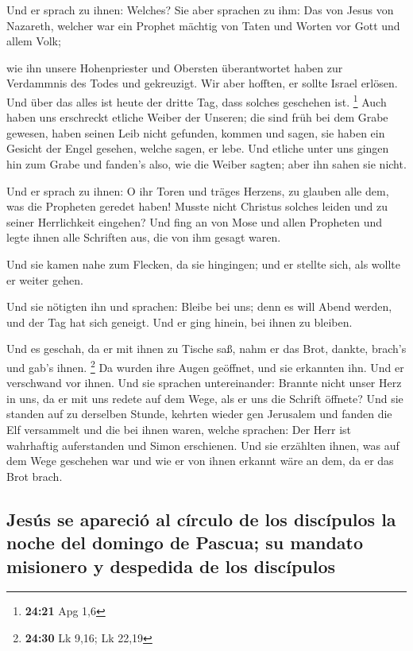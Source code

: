  Und er sprach zu ihnen: Welches? Sie aber sprachen zu
ihm: Das von Jesus von Nazareth, welcher war ein Prophet mächtig von
Taten und Worten vor Gott und allem Volk;

 wie ihn unsere Hohenpriester und Obersten überantwortet
haben zur Verdammnis des Todes und gekreuzigt.  Wir aber
hofften, er sollte Israel erlösen. Und über das alles ist heute der
dritte Tag, dass solches geschehen ist. \footnote{\textbf{24:21} Apg 1,6}
 Auch haben uns erschreckt etliche Weiber der Unseren;
die sind früh bei dem Grabe gewesen,  haben seinen Leib
nicht gefunden, kommen und sagen, sie haben ein Gesicht der Engel
gesehen, welche sagen, er lebe.  Und etliche unter uns
gingen hin zum Grabe und fanden's also, wie die Weiber sagten; aber ihn
sahen sie nicht.

 Und er sprach zu ihnen: O ihr Toren und träges Herzens,
zu glauben alle dem, was die Propheten geredet haben! 
Musste nicht Christus solches leiden und zu seiner Herrlichkeit
eingehen?  Und fing an von Mose und allen Propheten und
legte ihnen alle Schriften aus, die von ihm gesagt waren.

 Und sie kamen nahe zum Flecken, da sie hingingen; und er
stellte sich, als wollte er weiter gehen.

 Und sie nötigten ihn und sprachen: Bleibe bei uns; denn
es will Abend werden, und der Tag hat sich geneigt. Und er ging hinein,
bei ihnen zu bleiben.

 Und es geschah, da er mit ihnen zu Tische saß, nahm er
das Brot, dankte, brach's und gab's ihnen. \footnote{\textbf{24:30} Lk
  9,16; Lk 22,19}  Da wurden ihre Augen geöffnet, und sie
erkannten ihn. Und er verschwand vor ihnen.  Und sie
sprachen untereinander: Brannte nicht unser Herz in uns, da er mit uns
redete auf dem Wege, als er uns die Schrift öffnete?  Und
sie standen auf zu derselben Stunde, kehrten wieder gen Jerusalem und
fanden die Elf versammelt und die bei ihnen waren, 
welche sprachen: Der Herr ist wahrhaftig auferstanden und Simon
erschienen.  Und sie erzählten ihnen, was auf dem Wege
geschehen war und wie er von ihnen erkannt wäre an dem, da er das Brot
brach.

\hypertarget{jesuxfas-se-apareciuxf3-al-cuxedrculo-de-los-discuxedpulos-la-noche-del-domingo-de-pascua-su-mandato-misionero-y-despedida-de-los-discuxedpulos}{%
\subsection{Jesús se apareció al círculo de los discípulos la noche del
domingo de Pascua; su mandato misionero y despedida de los
discípulos}\label{jesuxfas-se-apareciuxf3-al-cuxedrculo-de-los-discuxedpulos-la-noche-del-domingo-de-pascua-su-mandato-misionero-y-despedida-de-los-discuxedpulos}}

